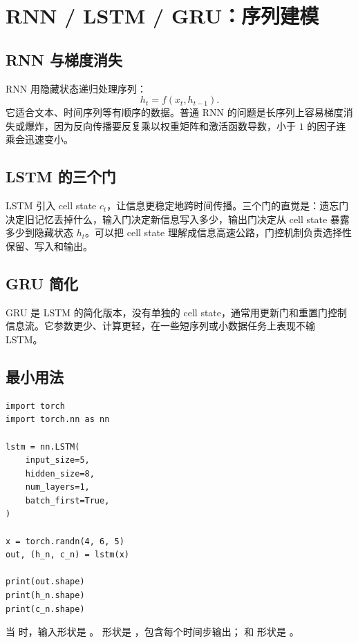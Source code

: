 \section{RNN / LSTM / GRU：序列建模}

\subsection{RNN 与梯度消失}

RNN 用隐藏状态递归处理序列：
\[
h_t=f(x_t,h_{t-1}).
\]
它适合文本、时间序列等有顺序的数据。普通 RNN 的问题是长序列上容易梯度消失或爆炸，因为反向传播要反复乘以权重矩阵和激活函数导数，小于 \(1\) 的因子连乘会迅速变小。

\subsection{LSTM 的三个门}

LSTM 引入 cell state \(c_t\)，让信息更稳定地跨时间传播。三个门的直觉是：遗忘门决定旧记忆丢掉什么，输入门决定新信息写入多少，输出门决定从 cell state 暴露多少到隐藏状态 \(h_t\)。可以把 cell state 理解成信息高速公路，门控机制负责选择性保留、写入和输出。

\subsection{GRU 简化}

GRU 是 LSTM 的简化版本，没有单独的 cell state，通常用更新门和重置门控制信息流。它参数更少、计算更轻，在一些短序列或小数据任务上表现不输 LSTM。

\subsection{ 最小用法}

\begin{lstlisting}
import torch
import torch.nn as nn

lstm = nn.LSTM(
    input_size=5,
    hidden_size=8,
    num_layers=1,
    batch_first=True,
)

x = torch.randn(4, 6, 5)
out, (h_n, c_n) = lstm(x)

print(out.shape)
print(h_n.shape)
print(c_n.shape)
\end{lstlisting}

当  时，输入形状是 。 形状是 \code{[4, 6, 8]}，包含每个时间步输出； 和  形状是 \code{[1, 4, 8]}。

